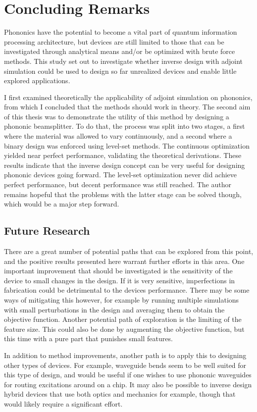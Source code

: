 \chapter{Concluding Remarks}

Phononics have the potential to become a vital part of quantum information
processing architecture, but devices are still limited to those that can be
investigated through analytical means and/or be optimized with brute force
methods.
This study set out to investigate whether inverse design with adjoint simulation
could be used to design so far unrealized devices and enable little explored
applications.

I first examined theoretically the applicability of adjoint simulation on
phononics, from which I concluded that the methods should work in theory.
The second aim of this thesis was to demonstrate the utility of this method by
designing a phononic beamsplitter.
To do that, the process was split into two stages, a first where the material
was allowed to vary continuously, and a second where a binary design was
enforced using level-set methods.
The continuous optimization yielded near perfect performance, validating the
theoretical derivations.
These results indicate that the inverse design concept can be very useful for
designing phononic devices going forward.
The level-set optimization never did achieve perfect performance, but
decent performance was still reached.
The author remains hopeful that the problems with the latter stage can be solved
though, which would be a major step forward.

\section{Future Research}

There are a great number of potential paths that can be explored from this
point, and the positive results presented here warrant further efforts in this
area.
One important improvement that should be investigated is the sensitivity of the
device to small changes in the design.
If it is very sensitive, imperfections in fabrication could be detrimental to
the devices performance.
There may be some ways of mitigating this however, for example by running
multiple simulations with small perturbations in the design and averaging them
to obtain the objective function.
Another potential path of exploration is the limiting of the feature size.
This could also be done by augmenting the objective function, but this time with
a pure part that punishes small features.

In addition to method improvements, another path is to apply this to designing
other types of devices. For example, waveguide bends seem to be well suited for
this type of design, and would be useful if one wishes to use phononic
waveguides for routing excitations around on a chip. It may also be possible to
inverse design hybrid devices that use both optics and mechanics for example,
though that would likely require a significant effort.
